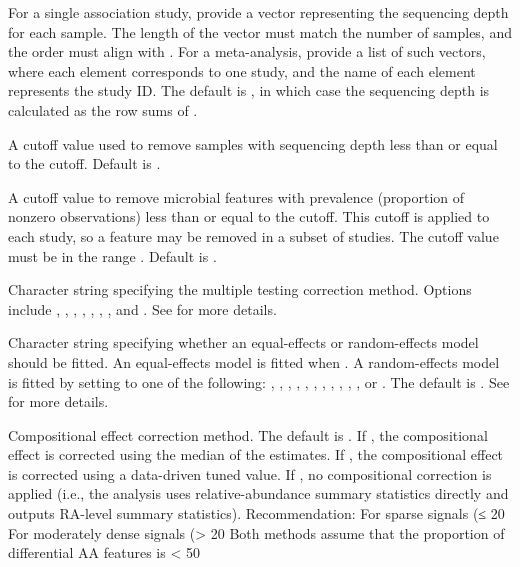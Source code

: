 \documentclass[a4paper]{book}
\begin{document}
\begin{Arguments}
\begin{ldescription}
\item[\code{depth}] For a single association study, provide a vector representing the sequencing depth for each sample.
The length of the vector must match the number of samples, and the order must align with .
For a meta-analysis, provide a list of such vectors, where each element corresponds to one study,
and the name of each element represents the study ID.
The default is , in which case the sequencing depth is calculated as the row sums of .

\item[\code{depth.filter}] A cutoff value used to remove samples with sequencing depth less than or equal to the cutoff.
Default is .

\item[\code{prev.filter}] A cutoff value to remove microbial features with prevalence (proportion of nonzero observations)
less than or equal to the cutoff. This cutoff is applied to each study, so a feature may be removed in a subset of studies.
The cutoff value must be in the range . Default is .

\item[\code{p.adjust.method}] Character string specifying the multiple testing correction method.
Options include , , , , ,
, , and . See  for more details.

\item[\code{meta.method}] Character string specifying whether an equal-effects or random-effects model should be fitted.
An equal-effects model is fitted when .
A random-effects model is fitted by setting  to one of the following:
, , , , , , ,
, , , , or .
The default is . See  for more details.

\item[\code{correct}] Compositional effect correction method. The default is .
If , the compositional effect is corrected using the median of the estimates.
If , the compositional effect is corrected using a data-driven tuned value.
If , no compositional correction is applied (i.e., the analysis uses relative-abundance summary
statistics directly and outputs RA-level summary statistics).
Recommendation: For sparse signals (≤ 20
For moderately dense signals (> 20
Both methods assume that the proportion of differential AA features is < 50


\end{ldescription}
\end{Arguments}
\end{document}
